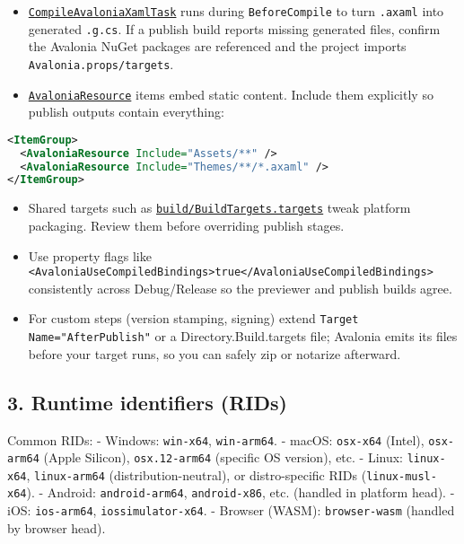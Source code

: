 \begin{itemize}
\tightlist
\item
  \href{https://github.com/AvaloniaUI/Avalonia/blob/master/src/Avalonia.Build.Tasks/CompileAvaloniaXamlTask.cs}{\passthrough{\lstinline!CompileAvaloniaXamlTask!}}
  runs during \passthrough{\lstinline!BeforeCompile!} to turn
  \passthrough{\lstinline!.axaml!} into generated
  \passthrough{\lstinline!.g.cs!}. If a publish build reports missing
  generated files, confirm the Avalonia NuGet packages are referenced
  and the project imports
  \passthrough{\lstinline!Avalonia.props/targets!}.
\item
  \href{https://github.com/AvaloniaUI/Avalonia/blob/master/src/Avalonia.Build.Tasks/AvaloniaResource.cs}{\passthrough{\lstinline!AvaloniaResource!}}
  items embed static content. Include them explicitly so publish outputs
  contain everything:
\end{itemize}

\begin{lstlisting}[language=XML]
<ItemGroup>
  <AvaloniaResource Include="Assets/**" />
  <AvaloniaResource Include="Themes/**/*.axaml" />
</ItemGroup>
\end{lstlisting}

\begin{itemize}
\tightlist
\item
  Shared targets such as
  \href{https://github.com/AvaloniaUI/Avalonia/blob/master/build/BuildTargets.targets}{\passthrough{\lstinline!build/BuildTargets.targets!}}
  tweak platform packaging. Review them before overriding publish
  stages.
\item
  Use property flags like
  \passthrough{\lstinline!<AvaloniaUseCompiledBindings>true</AvaloniaUseCompiledBindings>!}
  consistently across Debug/Release so the previewer and publish builds
  agree.
\item
  For custom steps (version stamping, signing) extend
  \passthrough{\lstinline!Target Name="AfterPublish"!} or a
  Directory.Build.targets file; Avalonia emits its files before your
  target runs, so you can safely zip or notarize afterward.
\end{itemize}

\subsection{3. Runtime identifiers
(RIDs)}\label{runtime-identifiers-rids}

Common RIDs: - Windows: \passthrough{\lstinline!win-x64!},
\passthrough{\lstinline!win-arm64!}. - macOS:
\passthrough{\lstinline!osx-x64!} (Intel),
\passthrough{\lstinline!osx-arm64!} (Apple Silicon),
\passthrough{\lstinline!osx.12-arm64!} (specific OS version), etc. -
Linux: \passthrough{\lstinline!linux-x64!},
\passthrough{\lstinline!linux-arm64!} (distribution-neutral), or
distro-specific RIDs (\passthrough{\lstinline!linux-musl-x64!}). -
Android: \passthrough{\lstinline!android-arm64!},
\passthrough{\lstinline!android-x86!}, etc. (handled in platform head).
- iOS: \passthrough{\lstinline!ios-arm64!},
\passthrough{\lstinline!iossimulator-x64!}. - Browser (WASM):
\passthrough{\lstinline!browser-wasm!} (handled by browser head).

